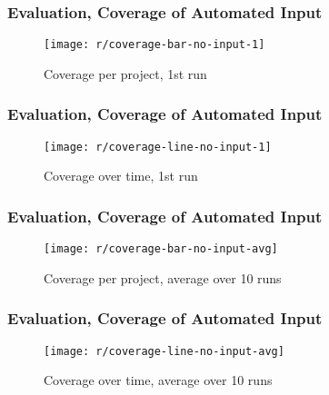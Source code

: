 \begin{frame}\frametitle{Evaluation, Coverage of Automated Input}
    \begin{figure}
        \texttt{[image: r/coverage-bar-no-input-1]}
        \caption{Coverage per project, 1st run}
    \end{figure}
\end{frame}

\begin{frame}\frametitle{Evaluation, Coverage of Automated Input}
    \begin{figure}
        \texttt{[image: r/coverage-line-no-input-1]}
        \caption{Coverage over time, 1st run}
    \end{figure}
\end{frame}

\begin{frame}\frametitle{Evaluation, Coverage of Automated Input}
    \begin{figure}
        \texttt{[image: r/coverage-bar-no-input-avg]}
        \caption{Coverage per project, average over 10 runs}
    \end{figure}
\end{frame}

\begin{frame}\frametitle{Evaluation, Coverage of Automated Input}
    \begin{figure}
        \texttt{[image: r/coverage-line-no-input-avg]}
        \caption{Coverage over time, average over 10 runs}
    \end{figure}
\end{frame}
